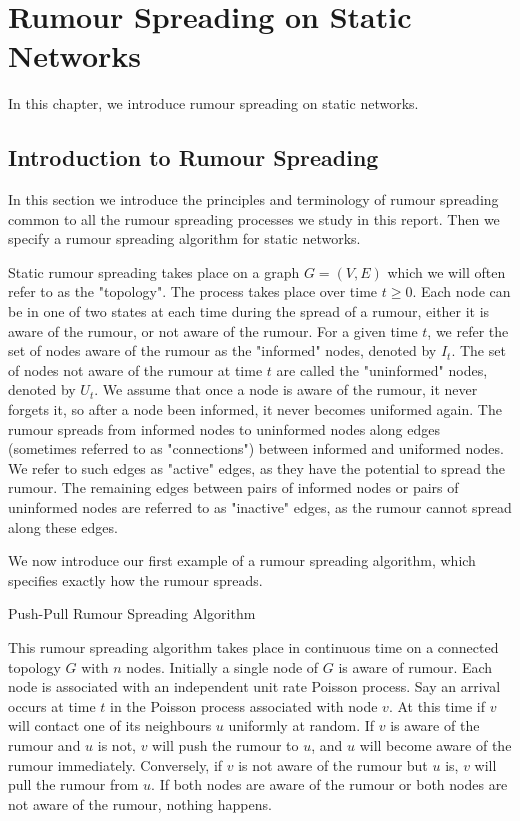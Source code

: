 \chapter{Rumour Spreading on Static Networks}\label{chapter:staticIntro}

In this chapter, we introduce rumour spreading on static networks.

\section{Introduction to Rumour Spreading}

In this section we introduce the principles and terminology of rumour spreading common to all the rumour spreading processes we study in this report. Then we specify a rumour spreading algorithm for static networks.

Static rumour spreading takes place on a graph $G=(V,E)$ which we will often refer to as the "topology". The process takes place over time $t \geq 0$. Each node can be in one of two states at each time during the spread of a rumour, either it is aware of the rumour, or not aware of the rumour. For a given time $t$, we refer the set of nodes aware of the rumour as the "informed" nodes, denoted by $I_t$. The set of nodes not aware of the rumour at time $t$ are called the "uninformed" nodes, denoted by $U_t$. We assume that once a node is aware of the rumour, it never forgets it, so after a node been informed, it never becomes uniformed again. The rumour spreads from informed nodes to uninformed nodes along edges (sometimes referred to as "connections") between informed and uniformed nodes. We refer to such edges as "active" edges, as they have the potential to spread the rumour. The remaining edges between pairs of informed nodes or pairs of uninformed nodes are referred to as "inactive" edges, as the rumour cannot spread along these edges. 

We now introduce our first example of a rumour spreading algorithm, which specifies exactly how the rumour spreads.  

\begin{definition}\label{algo:staticAsync}
	Push-Pull Rumour Spreading Algorithm

	\noindent
	This rumour spreading algorithm takes place in continuous time on a connected topology $G$ with $n$ nodes.
	Initially a single node of $G$ is aware of rumour. Each node is associated with an independent unit rate Poisson process. Say an arrival occurs at time $t$ in the Poisson process associated with node $v$. At this time if $v$ will contact one of its neighbours $u$ uniformly at random. If $v$ is aware of the rumour and $u$ is not, $v$ will push the rumour to $u$, and $u$ will become aware of the rumour immediately. Conversely, if $v$ is not aware of the rumour but $u$ is, $v$ will pull the rumour from $u$. If both nodes are aware of the rumour or both nodes are not aware of the rumour, nothing happens.
\end{definition}

